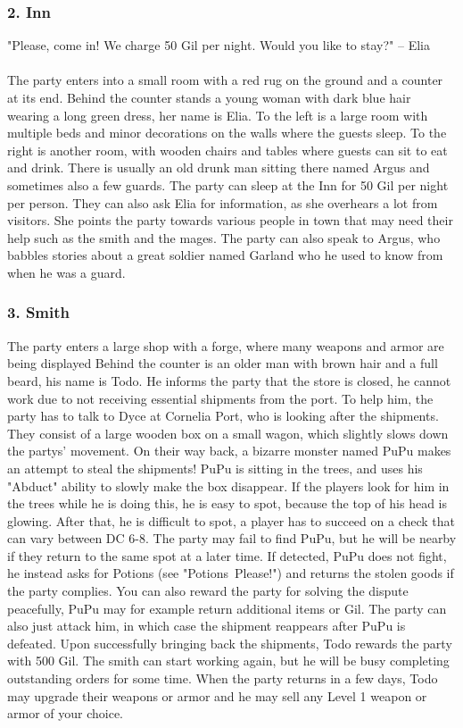 \subsubsection*{2. Inn}
"Please, come in! We charge 50 Gil per night. Would you like to stay?"
-- Elia \\\\
The party enters into a small room with a red rug on the ground and a counter at its end.
Behind the counter stands a young woman with dark blue hair wearing a long green dress, her name is Elia.
To the left is a large room with multiple beds and minor decorations on the walls where the guests sleep.
To the right is another room, with wooden chairs and tables where guests can sit to eat and drink.
There is usually an old drunk man sitting there named Argus and sometimes also a few guards.
The party can sleep at the Inn for 50 Gil per night per person.  
They can also ask Elia for information, as she overhears a lot from visitors.
She points the party towards various people in town that may need their help such as the smith and the mages.  
The party can also speak to Argus, who babbles stories about a great soldier named Garland who he used to know from when he was a guard. 
 
\subsubsection*{3. Smith}
The party enters a large shop with a forge, where many weapons and armor are being displayed
Behind the counter is an older man with brown hair and a full beard, his name is Todo.
He informs the party that the store is closed, he cannot work due to not receiving essential shipments from the port.
To help him, the party has to talk to Dyce at Cornelia Port, who is looking after the shipments. 
They consist of a large wooden box on a small wagon, which slightly slows down the partys' movement.
On their way back, a bizarre monster named PuPu makes an attempt to steal the shipments!
PuPu is sitting in the trees, and uses his "Abduct" ability to slowly make the box disappear. 
If the players look for him in the trees while he is doing this, he is easy to spot, because the top of his head is glowing.
After that, he is difficult to spot, a player has to succeed on a check that can vary between DC 6-8.
The party may fail to find PuPu, but he will be nearby if they return to the same spot at a later time.
If detected, PuPu does not fight, he instead asks for Potions (see "Potions~Please!") and returns the stolen goods if the party complies.
You can also reward the party for solving the dispute peacefully, PuPu may for example return additional items or Gil.
The party can also just attack him, in which case the shipment reappears after PuPu is defeated.
Upon successfully bringing back the shipments, Todo rewards the party with 500 Gil.
The smith can start working again, but he will be busy completing outstanding orders for some time.
When the party returns in a few days, Todo may upgrade their weapons or armor and he may sell any Level 1 weapon or armor of your choice.
\vfill


